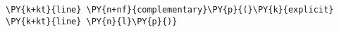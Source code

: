 \begin{Verbatim}[commandchars=\\\{\}]
    \PY{k+kt}{line} \PY{n+nf}{complementary}\PY{p}{(}\PY{k}{explicit} \PY{k+kt}{line} \PY{n}{l}\PY{p}{)}
\end{Verbatim}

